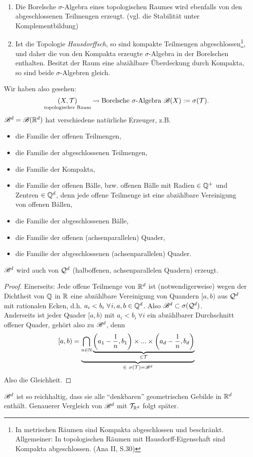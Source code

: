 \begin{remark} \
\begin{enumerate}[(\roman*),topsep=5pt, itemsep = 0 pt]
	\item Die Borelsche $\sigma$-Algebra eines topologischen Raumes wird ebenfalls von den abgeschlossenen Teilmengen erzeugt. (vgl. die Stabilität unter Komplementbildung)
	\item Ist die Topologie \emph{Hausdorffsch}, so sind kompakte Teilmengen abgeschlossen\footnote{In metrischen Räumen sind Kompakta abgeschlossen und beschränkt. Allgemeiner: In topologischen Räumen mit Hausdorff-Eigenschaft sind Kompakta abgeschlossen. (Ana II, S.30)}, und daher die von den Kompakta erzeugte $\sigma$-Algebra in der Borelschen enthalten. Besitzt der Raum eine abzählbare Überdeckung durch Kompakta, so sind beide $\sigma$-Algebren gleich.
\end{enumerate}
\end{remark}
Wir haben also gesehen:
$$
\underset{\text{topologischer Raum}}{(X,\mathcal{T})} \leadsto \text{Borelsche }\sigma\text{-Algebra } \mathscr{B}(X):= \sigma(\mathcal{T}).
$$
$\mathscr{B}^d=\mathscr{B}(\mathbb{R}^d)$ hat verschiedene natürliche Erzeuger, z.B.
\begin{itemize}
	\item die Familie der offenen Teilmengen,
	\item die Familie der abgeschlossenen Teilmengen,
	\item die Familie der Kompakta,
	\item die Familie der offenen Bälle, bzw. offenen Bälle mit Radien $\in \mathbb{Q}^+$ und Zentren $\in \mathbb{Q}^d$, denn jede offene Teilmenge ist eine abzählbare Vereinigung von offenen Bällen,
	\item die Familie der abgeschlossenen Bälle,
	\item die Familie der offenen (achsenparallelen) Quader,
	\item die Familie der abgeschlossenen (achsenparallelen) Quader.
\end{itemize}

\begin{lemma}
\begin{mdframed}
$\mathscr{B}^d$ wird auch von $\mathcal{Q}^d$ (halboffenen, achsenparallelen Quadern) erzeugt.
\end{mdframed}
\begin{proof}
Einerseits: Jede offene Teilmenge von $\mathbb{R}^d$ ist (notwendigerweise) wegen der Dichtheit von $\mathbb{Q}$ in $\mathbb{R}$ eine abzählbare Vereinigung von Quandern $[a,b)$ aus $\mathcal{Q}^d$ mit rationalen Ecken, d.h. $a_i<b_i \ \forall i, a,b\in \Q^d$. Also $\mathscr{B}^d \subset \sigma (\mathcal{Q}^d)$.\\
Anderseits ist jeder Quader $[a,b)$ mit $a_i<b_i\ \forall i$ ein abzählbarer Durchschnitt offener Quader, gehört also zu $\mathscr{B}^d$, denn
$$
[a,b) = \underbrace{\bigcap_{n\in \mathbb{N}} \underbrace{\left(a_1-\frac{1}{n}, b_1\right) \times ... \times \left(a_d-\frac{1}{n},b_d \right)}_{\in \mathcal{T}}}_{\in \ \sigma(\mathcal{T}) = \mathscr{B}^d}
$$
Also die Gleichheit.
\end{proof}
\end{lemma}
$\mathscr{B}^d$ ist so reichhaltig, dass sie alle ``denkbaren'' geometrischen Gebilde in $\mathbb{R}^d$ enthält. Genauerer Vergleich von $\mathscr{B}^d$ mit $\mathcal{T}_{\mathbb{R}^d}$ folgt später.

